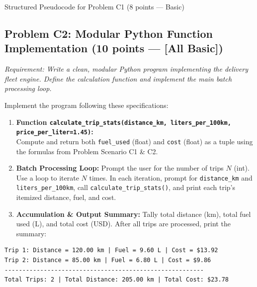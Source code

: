 \documentclass[11pt,a4paper]{article}
\begin{document}
\begin{answerbox}[height=5.2cm]{Structured Pseudocode for Problem C1 (8 points --- Basic)}
\end{answerbox}

\newpage


\subsection*{Problem C2: Modular Python Function Implementation (10 points --- [All Basic])}
\textit{Requirement: Write a clean, modular Python program implementing the delivery fleet engine. Define the calculation function and implement the main batch processing loop.}

Implement the program following these specifications:
\begin{enumerate}[label=\arabic*.,leftmargin=1.8em,itemsep=0.5pt]
  \item \textbf{Function \texttt{calculate\_trip\_stats(distance\_km, liters\_per\_100km, price\_per\_liter=1.45)}:}\\
    Compute and return both \texttt{fuel\_used} (float) and \texttt{cost} (float) as a tuple using the formulas from Problem Scenario C1 \& C2.
  \item \textbf{Batch Processing Loop:}
    Prompt the user for the number of trips $N$ (int). Use a loop to iterate $N$ times. In each iteration, prompt for \texttt{distance\_km} and \texttt{liters\_per\_100km}, call \texttt{calculate\_trip\_stats()}, and print each trip's itemized distance, fuel, and cost.
  \item \textbf{Accumulation \& Output Summary:}
    Tally total distance (km), total fuel used (L), and total cost (USD). After all trips are processed, print the summary:
\end{enumerate}

\begin{lstlisting}[basicstyle=\ttfamily\scriptsize]
Trip 1: Distance = 120.00 km | Fuel = 9.60 L | Cost = $13.92
Trip 2: Distance = 85.00 km | Fuel = 6.80 L | Cost = $9.86
--------------------------------------------------------
Total Trips: 2 | Total Distance: 205.00 km | Total Cost: $23.78
\end{lstlisting}
\end{document}
